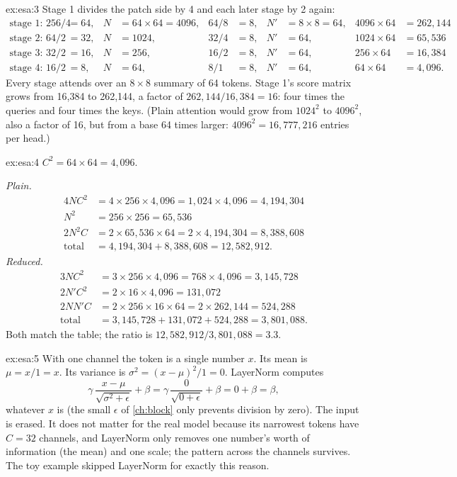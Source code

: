 \begin{solution}{ex:esa:3}
Stage 1 divides the patch side by 4 and each later stage by 2 again:
\begin{align*}
  \text{stage 1: } 256/4 &= 64, & N &= 64\times64 = 4096, & 64/8 &= 8, & N' &= 8\times8 = 64, & 4096\times64 &= 262{,}144\\
  \text{stage 2: } 64/2 &= 32, & N &= 1024, & 32/4 &= 8, & N' &= 64, & 1024\times64 &= 65{,}536\\
  \text{stage 3: } 32/2 &= 16, & N &= 256, & 16/2 &= 8, & N' &= 64, & 256\times64 &= 16{,}384\\
  \text{stage 4: } 16/2 &= 8, & N &= 64, & 8/1 &= 8, & N' &= 64, & 64\times64 &= 4{,}096 .
\end{align*}
Every stage attends over an $8\times8$ summary of 64 tokens. Stage 1's score matrix grows from
16{,}384 to 262{,}144, a factor of $262{,}144/16{,}384 = 16$: four times the queries and four times
the keys. (Plain attention would grow from $1024^2$ to $4096^2$, also a factor of 16, but from a
base 64 times larger: $4096^2 = 16{,}777{,}216$ entries per head.)
\end{solution}

\begin{solution}{ex:esa:4}
$C^2 = 64\times64 = 4{,}096$.

\emph{Plain.}
\begin{align*}
  4NC^2 &= 4\times256\times4{,}096 = 1{,}024\times4{,}096 = 4{,}194{,}304\\
  N^2 &= 256\times256 = 65{,}536\\
  2N^2C &= 2\times65{,}536\times64 = 2\times4{,}194{,}304 = 8{,}388{,}608\\
  \text{total} &= 4{,}194{,}304 + 8{,}388{,}608 = 12{,}582{,}912 .
\end{align*}
\emph{Reduced.}
\begin{align*}
  3NC^2 &= 3\times256\times4{,}096 = 768\times4{,}096 = 3{,}145{,}728\\
  2N'C^2 &= 2\times16\times4{,}096 = 131{,}072\\
  2NN'C &= 2\times256\times16\times64 = 2\times262{,}144 = 524{,}288\\
  \text{total} &= 3{,}145{,}728 + 131{,}072 + 524{,}288 = 3{,}801{,}088 .
\end{align*}
Both match the table; the ratio is $12{,}582{,}912/3{,}801{,}088 = 3.3$.
\end{solution}

\begin{solution}{ex:esa:5}
With one channel the token is a single number $x$. Its mean is $\mu = x/1 = x$. Its variance is
$\sigma^2 = (x - \mu)^2/1 = 0$. LayerNorm computes
\[
  \gamma\,\frac{x - \mu}{\sqrt{\sigma^2 + \epsilon}} + \beta = \gamma\,\frac{0}{\sqrt{0 + \epsilon}} + \beta = 0 + \beta = \beta ,
\]
whatever $x$ is (the small $\epsilon$ of \cref{ch:block} only prevents division by zero). The
input is erased. It does not matter for the real model because its narrowest tokens have
$C = 32$ channels, and LayerNorm only removes one number's worth of information (the mean) and one
scale; the pattern across the channels survives. The toy example skipped LayerNorm for exactly this
reason.
\end{solution}

